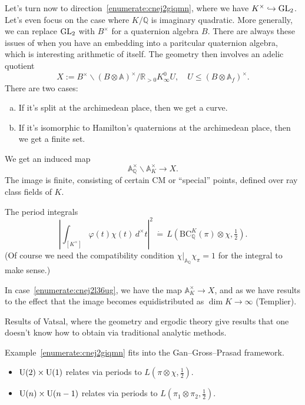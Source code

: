 \documentclass[reqno]{amsart} 
\begin{document}
Let's turn now to direction~\eqref{enumerate:cnej2giqmn}, where we have $K^\times \hookrightarrow \operatorname{GL}_2$.  Let's even focus on the case where $K/\mathbb{Q}$ is imaginary quadratic.  More generally, we can replace $\operatorname{GL}_2$ with $B^\times$ for a quaternion algebra $B$.  There are always these issues of when you have an embedding into a paritcular quaternion algebra, which is interesting arithmetic of itself.  The geometry then involves an adelic quotient
\begin{equation*}
  X
  :=
  B^\times \backslash 
  (B \otimes \mathbb{A})^\times
  / \mathbb{R}_{> 0} K _\infty^0 U,
  \quad
  U \leq(B \otimes \mathbb{A}_f)^\times.
\end{equation*}
There are two cases:
\begin{enumerate}[(a)]
\item\label{enumerate:cnej2l35vn} If it's split at the archimedean place, then we get a curve.
\item\label{enumerate:cnej2l36ug} If it's isomorphic to Hamilton's quaternions at the archimedean place, then we get a finite set.
\end{enumerate}

We get an induced map
\begin{equation*}
  \mathbb{A}_{\mathbb{Q}}^\times \backslash \mathbb{A}_K^\times \rightarrow X.
\end{equation*}
The image is finite, consisting of certain CM or ``special'' points, defined over ray class fields of $K$.

The period integrals
\begin{equation}\label{eq:cnej2m5ln6}
  \left\lvert \int_{[K^\times]} \varphi(t) \chi(t) \, d^\times t \right\rvert^2
  \, \dot{=} \,
  L(\mathrm{BC}_{\mathbb{Q}}^K(\pi) \otimes \chi, \tfrac{1}{2}).
\end{equation}
(Of course we need the compatibility condition $\chi|_{\mathbb{A}_\mathbb{Q}} \chi_\pi = 1$ for the integral to make sense.)

In case~\eqref{enumerate:cnej2l36ug}, we have the map $\mathbb{A}_K^\times \rightarrow X$, and as we have results to the effect that the image becomes equidistributed as $\dim K \rightarrow \infty$ (Templier).

Results of Vatsal, where the geometry and ergodic theory give results that one doesn't know how to obtain via traditional analytic methods.

Example~\eqref{enumerate:cnej2giqmn} fits into the Gan--Gross--Prasad framework.
\begin{itemize}
\item $\operatorname{U}(2) \times \operatorname{U}(1)$ relates via periods to $L(\pi \otimes \chi, \tfrac{1}{2})$.
\item $\operatorname{U}(n) \times \operatorname{U}(n - 1)$ relates via periods to $L(\pi_1 \otimes \pi_2, \tfrac{1}{2})$.
\end{itemize}
\end{document}
